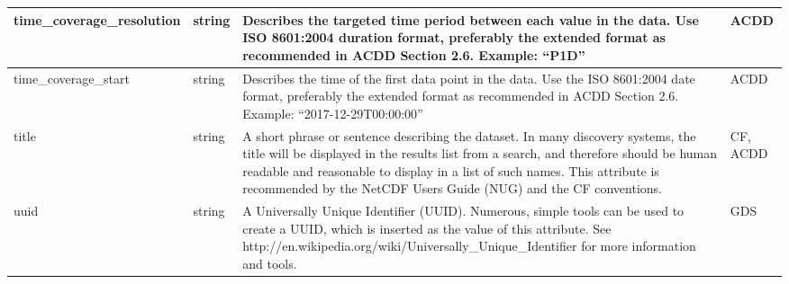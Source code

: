 \begin{longtable}{|p{}|p{}|p{}|p{}|}
\rowcolor{cyan!25} 
time\_coverage\_resolution & string & Describes the targeted time period between each value in the data. Use ISO 8601:2004 duration format, preferably the extended format as recommended in ACDD Section 2.6.  Example: “P1D” & ACDD \\ \hline

\rowcolor{cyan!25} 
time\_coverage\_start & string & Describes the time of the first data point in the data. Use the ISO 8601:2004 date format, preferably the extended format as recommended in ACDD Section 2.6.  Example: “2017-12-29T00:00:00” & ACDD \\ \hline

\rowcolor{cyan!25} 
title & string & A short phrase or sentence describing the dataset. In many discovery systems, the title will be displayed in the results list from a search, and therefore should be human readable and reasonable to display in a list of such names. This attribute is recommended by the NetCDF Users Guide (NUG) and the CF conventions. & CF, ACDD \\ \hline

\rowcolor{cyan!25} 
uuid & string & A Universally Unique Identifier (UUID). Numerous, simple tools can be used to create a UUID, which is inserted as the value of this attribute. See http://en.wikipedia.org/wiki/Universally\_Unique\_Identifier for more information and tools. & GDS \\ \hline

\end{longtable}
